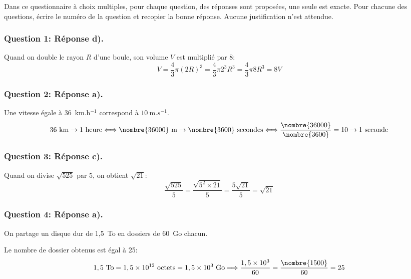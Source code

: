 Dans ce questionnaire à choix multiples, pour chaque question, des réponses sont proposées, une seule est exacte. Pour chacune des questions, écrire le numéro de la question et recopier la bonne réponse. Aucune justification n'est attendue.
\subsubsection*{Question 1: Réponse d).}
Quand on double le rayon $R$ d'une boule, son volume $V$ est multiplié par 8: \[
V=\dfrac{4}{3}\pi (2R)^3=\dfrac{4}{3}\pi 2^3R^3=\dfrac{4}{3}\pi 8R^3=8V
\]

\subsubsection*{Question 2: Réponse a).}
Une vitesse égale à 36~km.h$^{-1}$ correspond à $10~\text{m}.s^{-1}$.
\[
36~\text{km}\to 1~\text{heure}\Longleftrightarrow \nombre{36000}~\text{m}\to \nombre{3600}~\text{secondes}\Longleftrightarrow \frac{\nombre{36000}}{\nombre{3600}}=10\to 1~\text{seconde}
\]
\subsubsection*{Question 3: Réponse c).}
Quand on divise $\sqrt{525}$ par 5, on obtient $\sqrt{21}$:
\[
\frac{\sqrt{525}}{5}=\frac{\sqrt{5^2\times 21}}{5}=\frac{5\sqrt{21}}{5}=\sqrt{21}
\]

\subsubsection*{Question 4: Réponse a).}
On partage un disque dur de 1,5~To en dossiers de 60~Go chacun.

Le nombre de dossier obtenus est égal à 25:
\[
1,5~\text{To}=1,5\times 10^{12}~\text{octets}=1,5\times 10^{3}~\text{Go}\Longrightarrow
\frac{1,5\times 10^3}{60}=\frac{\nombre{1500}}{60}=25
\]

\vspace{0,5cm}

